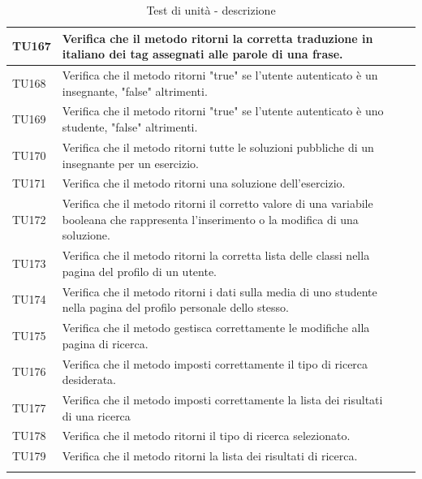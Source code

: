 \begin{longtable}{|>{\centering\arraybackslash}m{1.6cm}|>{\centering\arraybackslash}m{6.41cm}|>{\centering\arraybackslash}m{3.1cm}| c |}
		TU167 & Verifica che il metodo ritorni la corretta traduzione in italiano dei tag assegnati alle parole di una frase. \\ \hline
		\rowcolor{LightGray}
		TU168 & Verifica che il metodo ritorni "true" se l'utente autenticato è un insegnante, "false" altrimenti. \\ \hline
		TU169 & Verifica che il metodo ritorni "true" se l'utente autenticato è uno studente, "false" altrimenti. \\ \hline
		\rowcolor{LightGray}
		TU170 & Verifica che il metodo ritorni tutte le soluzioni pubbliche di un insegnante per un esercizio. \\ \hline
		TU171 & Verifica che il metodo ritorni una soluzione dell'esercizio. \\ \hline
		\rowcolor{LightGray}
		TU172 & Verifica che il metodo ritorni il corretto valore di una variabile booleana che rappresenta l'inserimento o la modifica di una soluzione.\\ \hline
		TU173 & Verifica che il metodo ritorni la corretta lista delle classi nella pagina del profilo di un utente. \\ \hline
		\rowcolor{LightGray}
		TU174 & Verifica che il metodo ritorni i dati sulla media di uno studente nella pagina del profilo personale dello stesso. \\ \hline
		TU175 & Verifica che il metodo gestisca correttamente le modifiche alla pagina di ricerca. \\ \hline
		\rowcolor{LightGray}
		TU176 & Verifica che il metodo imposti correttamente il tipo di ricerca desiderata. \\ \hline
		TU177 & Verifica che il metodo imposti correttamente la lista dei risultati di una ricerca\\ \hline
		\rowcolor{LightGray}
		TU178 & Verifica che il metodo ritorni il tipo di ricerca selezionato. \\ \hline
		TU179 & Verifica che il metodo ritorni la lista dei risultati di ricerca. \\ \hline
		
		\caption{Test di unità - descrizione}
\end{longtable}

